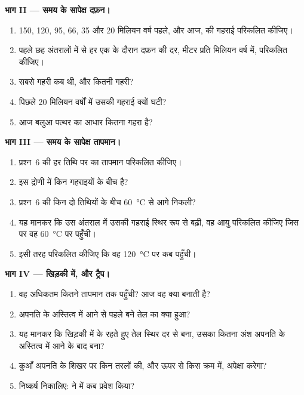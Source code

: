 \begin{problem}[{सप्ताहांत समस्या --- एक कल्पित द्रोणी के तेल का काल-निर्धारण}]
\medskip
\noindent\textbf{भाग II --- समय के सापेक्ष दफ़न।}
\begin{enumerate}[resume]
  \item 150, 120, 95, 66, 35 और 20
        मिलियन वर्ष पहले, और आज,  की गहराई परिकलित कीजिए।
  \item पहले छह अंतरालों में से हर एक के दौरान दफ़न की दर, मीटर प्रति मिलियन वर्ष में,
        परिकलित कीजिए।
  \item {} सबसे गहरी कब थी, और कितनी गहरी?
  \item पिछले 20 मिलियन वर्षों में उसकी गहराई क्यों घटी?
  \item आज बलुआ पत्थर का आधार कितना गहरा है?
\end{enumerate}

\medskip
\noindent\textbf{भाग III --- समय के सापेक्ष तापमान।}
\begin{enumerate}[resume]
  \item प्रश्न~6 की हर तिथि पर  का तापमान परिकलित
        कीजिए।
  \item इस द्रोणी में  किन गहराइयों के बीच है?
  \item प्रश्न~6 की किन दो तिथियों के बीच 
        \qty{60}{\degreeCelsius} से आगे निकली?
  \item यह मानकर कि उस अंतराल में उसकी गहराई स्थिर रूप से बढ़ी, वह आयु परिकलित कीजिए
        जिस पर वह \qty{60}{\degreeCelsius} पर पहुँची।
  \item इसी तरह परिकलित कीजिए कि वह \qty{120}{\degreeCelsius} पर कब पहुँची।
\end{enumerate}

\medskip
\noindent\textbf{भाग IV --- खिड़की में, और ट्रैप।}
\begin{enumerate}[resume]
  \item वह अधिकतम कितने तापमान तक पहुँची? आज वह क्या
        बनाती है?
  \item अपनति के अस्तित्व में आने से पहले बने तेल का क्या हुआ?
  \item यह मानकर कि खिड़की में  के रहते हुए तेल स्थिर दर से बना,
        उसका कितना अंश अपनति के अस्तित्व में आने के बाद बना?
  \item कुआँ अपनति के शिखर पर किन तरलों की, और ऊपर से किस क्रम में, अपेक्षा
        करेगा?
  \item निष्कर्ष निकालिए:  ने  में कब प्रवेश किया?
\end{enumerate}
\end{problem}
